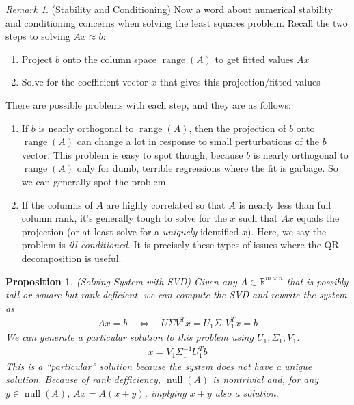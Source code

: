 \documentclass[12pt]{article}
\numberwithin{equation}{section} %
\theoremstyle{plain}
\newtheorem{prop}[thm]{Proposition}
\theoremstyle{definition}
\theoremstyle{remark}
\newtheorem*{rmk}{Remark}
\newcommand{\Rmn}{\mathbb{R}^{m\times n}}
\newcommand{\nul}{\operatorname{null}}
\newcommand{\range}{\operatorname{range}}
\begin{document}
\begin{rmk}({Stability and Conditioning})
Now a word about numerical stability and conditioning concerns when
solving the least squares problem. Recall the two steps to solving
$Ax\approx b$:
\begin{enumerate}[label=(\roman*)]
  \item Project $b$ onto the column space $\range(A)$ to get fitted
    values $Ax$
  \item Solve for the coefficient vector $x$ that gives this
    projection/fitted values
\end{enumerate}
There are possible problems with each step, and they are as follows:
\begin{enumerate}[label=(\roman*)]
  \item
    If $b$ is nearly orthogonal to $\range(A)$, then the projection of
    $b$ onto $\range(A)$ can change a lot in response to small
    perturbations of the $b$ vector. This problem is easy to spot
    though, because $b$ is nearly orthogonal to $\range(A)$ only for
    dumb, terrible regressions where the fit is garbage. So we can
    generally spot the problem.
  \item If the columns of $A$ are highly correlated so that $A$ is
    nearly less than full column rank, it's generally tough to solve for
    the $x$ such that $Ax$ equals the projection (or at least solve for
    a \emph{uniquely} identified $x$). Here, we say the problem is
    \emph{ill-conditioned}. It is precisely these types of issues where
    the QR decomposition is useful.
\end{enumerate}
\end{rmk}


\begin{prop}
\emph{(Solving System with SVD)}
Given any $A\in\Rmn$ that is possibly tall \emph{or}
square-but-rank-deficient, we can compute the SVD and rewrite the system
as
\begin{align*}
  Ax = b
  \quad\iff\quad
  U\Sigma V^Tx
  =
  U_1\Sigma_1 V_1^Tx
  = b
\end{align*}
We can generate a particular solution to this problem
using $U_1,\Sigma_1,V_1$:
\begin{align}
  x = V_1\Sigma_1^{-1}U_1^Tb
  \label{svdsoln}
\end{align}
This is a ``\emph{particular}'' solution because the system does not
have a unique solution.
Because of rank defficiency, $\nul(A)$ is nontrivial and, for any
$y\in\nul(A)$, $Ax=A(x+y)$, implying $x+y$ also a solution.
\end{prop}
\end{document}
